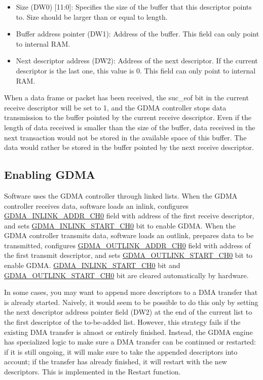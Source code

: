 \documentclass[main\_\_EN.tex]{subfiles}
\begin{document}
\begin{itemize}
    \item Size (DW0) [11:0]: Specifies the size of the buffer that this descriptor points to. Size should be larger than or equal to length.
    \item Buffer address pointer (DW1): Address of the buffer. This field can only point to internal RAM.
    \item Next descriptor address (DW2): Address of the next descriptor. If the current descriptor is the last one, this value is 0. This field can only point to internal RAM.
\end{itemize}

When a data frame or packet has been received, the suc\_eof bit in the current receive descriptor will be set to 1, and the GDMA controller stops data transmission to the buffer pointed by the current receive descriptor. Even if the length of data received is smaller than the size of the buffer, data received in the next transaction would not be stored in the available space of this buffer. The data would rather be stored in the buffer pointed by the next receive descriptor.



\subsection{Enabling GDMA}

Software uses the GDMA controller through linked lists. When the GDMA controller receives data, software loads an inlink, configures \hyperref[fielddesc:GDMAINLINKADDRCH0]{GDMA\_INLINK\_ADDR\_CH0} field with address of the first receive descriptor, and sets \hyperref[fielddesc:GDMAINLINKSTARTCH0]{GDMA\_INLINK\_START\_CH0} bit to enable GDMA. When the GDMA controller transmits data, software loads an outlink, prepares data to be transmitted, configures \hyperref[fielddesc:GDMAOUTLINKADDRCH0]{GDMA\_OUTLINK\_ADDR\_CH0} field with address of the first transmit descriptor, and sets \hyperref[fielddesc:GDMAOUTLINKSTARTCH0]{GDMA\_OUTLINK\_START\_CH0} bit to enable GDMA. \hyperref[fielddesc:GDMAINLINKSTARTCH0]{GDMA\_INLINK\_START\_CH0} bit and \hyperref[fielddesc:GDMAOUTLINKSTARTCH0]{GDMA\_OUTLINK\_START\_CH0} bit are cleared automatically by hardware.

In some cases, you may want to append more descriptors to a DMA transfer that is already started. Naively, it would seem to be possible to do this only by setting the next descriptor address pointer field (DW2) at the end of the current list to the first descriptor of the to-be-added list. However, this strategy fails if the existing DMA transfer is almost or entirely finished. Instead, the GDMA engine has specialized logic to make sure a DMA transfer can be continued or restarted: if it is still ongoing, it will make sure to take the appended descriptors into account; if the transfer has already finished, it will restart with the new descriptors. This is implemented in the Restart function.
\end{document}
